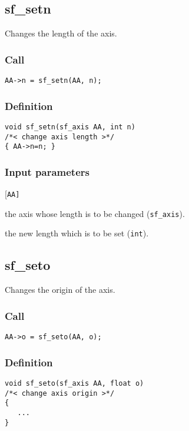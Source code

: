 \subsection{{sf\_setn}}
Changes the length of the axis.

\subsubsection*{Call}
\begin{verbatim}AA->n = sf_setn(AA, n);\end{verbatim}

\subsubsection*{Definition}
\begin{verbatim}  
void sf_setn(sf_axis AA, int n)
/*< change axis length >*/
{ AA->n=n; }
\end{verbatim}

\subsubsection{Input parameters}
\begin{desclist}{\tt }{\quad}[\tt AA]
   \setlength\itemsep{0pt}
   \item[AA] the axis whose length is to be changed (\texttt{sf\_axis}).  
   \item[n]  the new length which is to be set (\texttt{int}).  
\end{desclist}




\subsection{{sf\_seto}}
Changes the origin of the axis.

\subsubsection*{Call}
\begin{verbatim}AA->o = sf_seto(AA, o);\end{verbatim}

\subsubsection*{Definition}
\begin{verbatim}  
void sf_seto(sf_axis AA, float o)
/*< change axis origin >*/
{
   ...
}
\end{verbatim}

